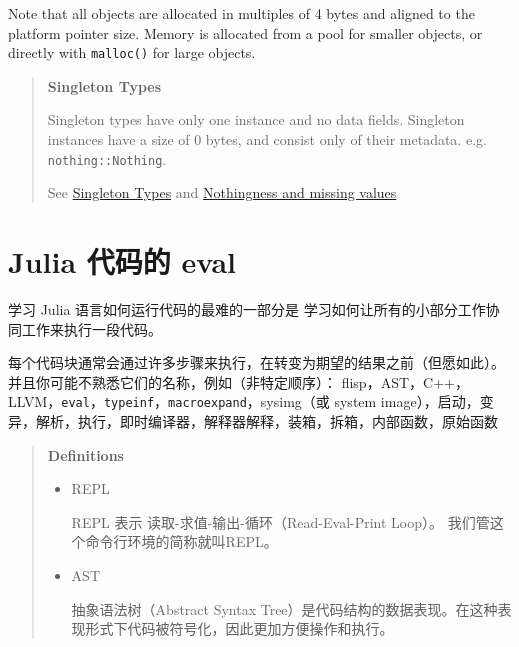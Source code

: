 Note that all objects are allocated in multiples of 4 bytes and aligned to the platform pointer size. Memory is allocated from a pool for smaller objects, or directly with \texttt{malloc()} for large objects.



\begin{quote}
\textbf{Singleton Types}

Singleton types have only one instance and no data fields. Singleton instances have a size of 0 bytes, and consist only of their metadata. e.g. \texttt{nothing::Nothing}.

See \hyperlink{14008188290941962431}{Singleton Types} and \href{@ref}{Nothingness and missing values}

\end{quote}


\hypertarget{10481677756025410412}{}


\section{Julia 代码的 eval}



学习 Julia 语言如何运行代码的最难的一部分是 学习如何让所有的小部分工作协同工作来执行一段代码。



每个代码块通常会通过许多步骤来执行，在转变为期望的结果之前（但愿如此）。并且你可能不熟悉它们的名称，例如（非特定顺序）： flisp，AST，C++，LLVM，\texttt{eval}，\texttt{typeinf}，\texttt{macroexpand}，sysimg（或 system image），启动，变异，解析，执行，即时编译器，解释器解释，装箱，拆箱，内部函数，原始函数



\begin{quote}
\textbf{Definitions}

\begin{itemize}
\item REPL

REPL 表示 读取-求值-输出-循环（Read-Eval-Print Loop）。 我们管这个命令行环境的简称就叫REPL。


\item AST

抽象语法树（Abstract Syntax Tree）是代码结构的数据表现。在这种表现形式下代码被符号化，因此更加方便操作和执行。

\end{itemize}
\end{quote}


\hypertarget{12349293482799060845}{}


